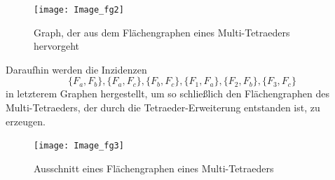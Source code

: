 \documentclass[12pt,titlepage,twoside,cleardoublepage]{article}
\theoremstyle{nummermitklammern}
\numberwithin{equation}{section}
\begin{document}
\begin{figure}[H]
\begin{center}
\texttt{[image: Image\_fg2]}
\end{center}
\caption{Graph, der aus dem Flächengraphen eines Multi-Tetraeders hervorgeht}
\end{figure}
Daraufhin werden die Inzidenzen 
\[
\{F_a,F_b\},\{F_a,F_c\},\{F_b,F_c\},\{F_1,F_a\},\{F_2,F_b\},\{F_3,F_c\}
\] 
in letzterem Graphen hergestellt, um so schließlich den Flächengraphen des Multi-Tetraeders, der durch die Tetraeder-Erweiterung entstanden ist, zu erzeugen.
\begin{figure}[H]
\begin{center}
\texttt{[image: Image\_fg3]}
\end{center}
\caption{Ausschnitt eines Flächengraphen eines Multi-Tetraeders}
\end{figure}
\end{document}
